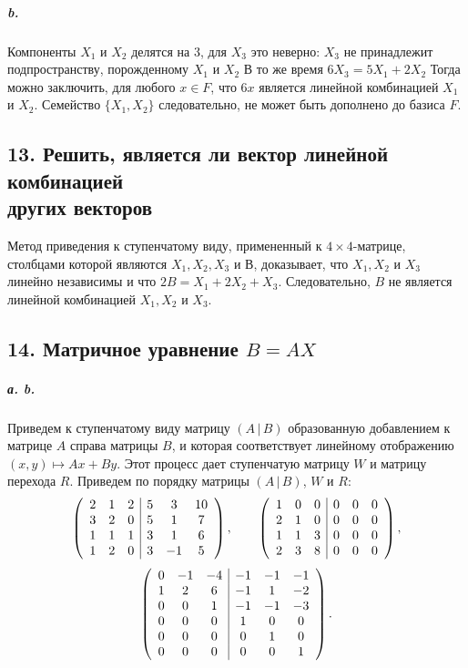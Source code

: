 {\subparagraph{b.} Компоненты $X_1$ и $X_2$ делятся на 3, для $X_3$ это неверно: $X_3$ не
принадлежит подпространству, порожденному $X_1$ и $X_2$ В то же время
$6X_3 = 5X_1 + 2X_2$ Тогда можно заключить, для любого $x \in F$, что $6x$
является линейной комбинацией $X_1$ и $X_2$. Семейство $\{X_{1},X_{2}\}$ следовательно, не может быть дополнено до базиса $F$.



\subsection{\normalsize{13. Решить, является ли вектор линейной комбинацией\\
других векторов}}

Метод приведения к ступенчатому виду, примененный к $4 \times 4$-матрице, столбцами которой являются $X_{1}, X_{2}, X_{3}$ и $В$, доказывает, что $X_{1}, X_{2}$ и $X_{3}$ линейно независимы и что $2B = X_1 + 2X_2 + X_3$. Следовательно, $B$ не является линейной комбинацией $X_{1}, X_{2}$ и $X_{3}$.

\subsection{\normalsize{14. Матричное уравнение $B = AX$}}

\subparagraph{а. b.} Приведем к ступенчатому виду матрицу $(A\,|\,B)$ образованную добавлением к матрице $A$ справа матрицы $B$, и которая соответствует линейному отображению $(x, y) \mapsto Ax+By$. Этот процесс дает ступенчатую матрицу $W$ и матрицу перехода $R$. Приведем по порядку матрицы\linebreak
$(A\,|\,B)$, $W$ и $R$:
\[ \left( \begin{array}{cccccc}
2 & 1 & 2 & \multicolumn{1}{|c}{5} & 3 & 10 \\
3 & 2 & 0 & \multicolumn{1}{|c}{5} & 1 & 7 \\
1 & 1 & 1 & \multicolumn{1}{|c}{3} & 1 & 6 \\
1 & 2 & 0 & \multicolumn{1}{|c}{3} & -1 & 5
\end{array} \right),\qquad
\left( \begin{array}{cccccc}
1 & 0 & 0 & \multicolumn{1}{|c}{0} & 0 & 0 \\
2 & 1 & 0 & \multicolumn{1}{|c}{0} & 0 & 0 \\
1 & 1 & 3 & \multicolumn{1}{|c}{0} & 0 & 0 \\
2 & 3 & 8 & \multicolumn{1}{|c}{0} & 0 & 0
\end{array} \right),\]
\[
\left( \begin{array}{cccccc}
0 & -1 & -4 & \multicolumn{1}{|c}{-1} & -1 & -1 \\
1 & 2 & 6 & \multicolumn{1}{|c}{-1} & 1 & -2 \\
0 & 0 & 1 & \multicolumn{1}{|c}{-1} & -1 & -3 \\
0 & 0 & 0 & \multicolumn{1}{|c}{1} & 0 & 0 \\
0 & 0 & 0 & \multicolumn{1}{|c}{0} & 1 & 0 \\
0 & 0 & 0 & \multicolumn{1}{|c}{0} & 0 & 1
\end{array} \right). \]

}

